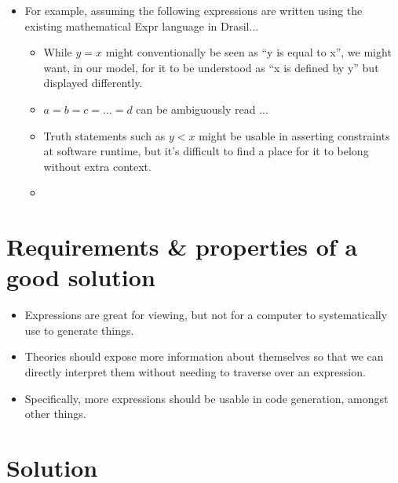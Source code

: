 \begin{itemize}
	\item For example, assuming the following expressions are written using
	      the existing mathematical Expr language in Drasil...
	      \begin{itemize}

		      \item While \(y = x\) might conventionally be seen as ``y is
		            equal to x'', we might want, in our model, for it to be
		            understood as ``x is defined by y'' but displayed differently.

		      \item \(a = b = c = ... = d\) can be ambiguously read ...

		      \item Truth statements such as \(y < x\) might be usable in
		            asserting constraints at software runtime, but it's
		            difficult to find a place for it to belong without extra
		            context.

		      \item {}

	      \end{itemize}

\end{itemize}

\section{Requirements \& properties of a good solution}

\begin{itemize}

	\item Expressions are great for viewing, but not for a computer to
	      systematically use to generate things.

	\item Theories should expose more information about themselves so that
	      we can directly interpret them without needing to traverse over
	      an expression.

	\item Specifically, more expressions should be usable in code generation,
	      amongst other things.

\end{itemize}

\section{Solution}


